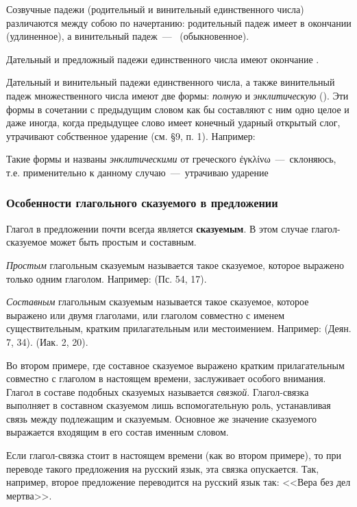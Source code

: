 \documentclass[11pt,a4paper,oneside]{memoir}
\begin{document}
Созвучные падежи (родительный и винительный единственного числа)
различаются между собою по начертанию: родительный падеж имеет в
окончании {} (удлиненное), а винительный падеж~---~{}
(обыкновенное).

Дательный и предложный падежи единственного числа имеют окончание {}.

Дательный и винительный падежи единственного числа, а также
винительный падеж множественного числа имеют две формы: \emph{полную}
и \emph{энклитическую} ({}). Эти формы в сочетании с предыдущим словом как бы составляют с
ним одно целое и даже иногда, когда предыдущее слово имеет конечный
ударный открытый слог, утрачивают собственное ударение (см. \S9, п.
1). Например: {}

Такие формы и названы \emph{энклитическими} от греческого
\textgreek{ἐγκλίνω}~---~склоняюсь, т.е. применительно к данному
случаю~---~утрачиваю ударение

\subsubsection{Особенности глагольного сказуемого в предложении}

Глагол в предложении почти всегда является \textbf{сказуемым}. В этом
случае глагол-сказуемое может быть простым и составным.

\emph{Простым} глагольным сказуемым называется такое сказуемое,
которое выражено только одним глаголом. Например: {} (Пс. 54, 17).

\emph{Составным} глагольным сказуемым называется такое сказуемое,
которое выражено или двумя глаголами, или глаголом совместно с именем
существительным, кратким прилагательным или местоимением. Например:
{} (Деян. 7, 34). {} (Иак. 2, 20).

Во втором примере, где составное сказуемое выражено кратким
прилагательным совместно с глаголом {} в настоящем
времени, заслуживает особого внимания. Глагол {} в составе
подобных сказуемых называется \emph{связкой}. Глагол-связка выполняет
в составном сказуемом лишь вспомогательную роль, устанавливая связь
между подлежащим и сказуемым. Основное же значение сказуемого
выражается входящим в его состав именным словом.

Если глагол-связка стоит в настоящем времени (как во втором примере),
то при переводе такого предложения на русский язык, эта связка
опускается. Так, например, второе предложение переводится на русский
язык так: <<Вера без дел мертва>>.
\end{document}
